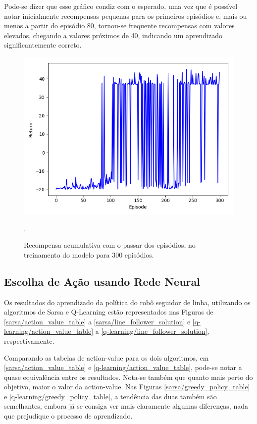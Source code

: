 \documentclass[conference]{IEEEtran}
\begin{document}
	Pode-se dizer que esse gráfico condiz com o esperado, uma vez que é possível notar inicialmente recompensas pequenas para os primeiros episódios e, mais ou menos a partir do episódio 80, tornou-se frequente recompensas com valores elevados, chegando a valores próximos de 40, indicando um aprendizado significantemente correto.

\begin{figure}[htbp]
\centering
\centerline{\includegraphics[scale=0.3]{imagens/train/15.png}}
\caption{Recompensa acumulativa com o passar dos episódios, no treinamento do modelo para 300 episódios.}.
\label{train/15}
\end{figure} 

	\subsection{Escolha de Ação usando Rede Neural}

Os resultados do aprendizado da política do robô seguidor de linha, utilizando os algoritmos de Sarsa e Q-Learning estão representados nas Figuras de \ref{sarsa/action_value_table} a \ref{sarsa/line_follower_solution} e \ref{q-learning/action_value_table} a \ref{q-learning/line_follower_solution}, respectivamente.

Comparando as tabelas de action-value para os dois algoritmos, em \ref{sarsa/action_value_table} e \ref{q-learning/action_value_table}, pode-se notar a quase equivalência entre os resultados. Nota-se também que quanto mais perto do objetivo, maior o valor da action-value. Nas Figuras \ref{sarsa/greedy_policy_table} e \ref{q-learning/greedy_policy_table}, a tendência das duas também são semelhantes, embora já se consiga ver mais claramente algumas diferenças, nada que prejudique o processo de aprendizado.
\end{document}
